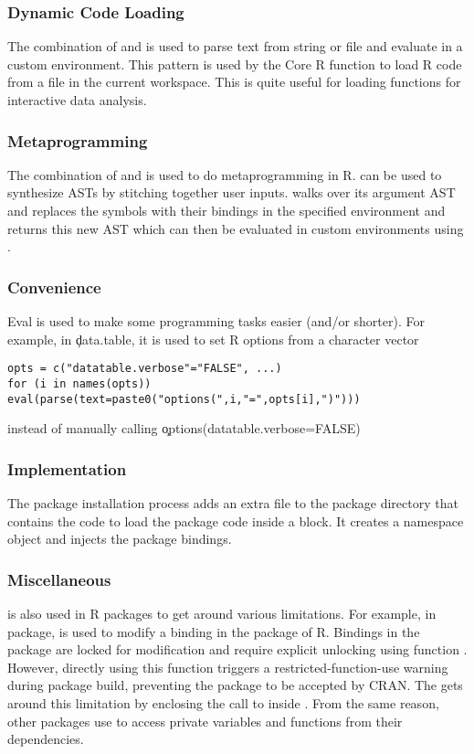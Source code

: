\documentclass[USenglish,cleveref, autoref, thm-restate]{lipics-v2019}
\begin{document}
\subsubsection{Dynamic Code Loading} The combination of \parse and \eval is
used to parse text from string or file and evaluate in a custom environment.
This pattern is used by the \source Core R function to load R code from a
file in the current workspace. This is quite useful for loading functions
for interactive data analysis.

\subsubsection{Metaprogramming} The combination of \eval and \substitute is
 used to do metaprogramming in R. \substitute can be used to synthesize ASTs
 by stitching together user inputs. \substitute walks over its argument AST
 and replaces the symbols with their bindings in the specified environment
 and returns this new AST which can then be evaluated in custom environments
 using \eval.

  \subsubsection{Convenience} Eval is used to make some programming tasks easier (and/or shorter). For example, in \c{data.table}, it is used to set R options from a character vector
  \begin{lstlisting}
opts = c("datatable.verbose"="FALSE", ...)
for (i in names(opts)) eval(parse(text=paste0("options(",i,"=",opts[i],")")))

  \end{lstlisting}
  instead of manually calling \c{options(datatable.verbose=FALSE)}

  \subsubsection{Implementation}
  The package installation process adds an extra file to the package directory
  that contains the code to load the package code inside a \local block. It
  creates a namespace object and injects the package bindings.

  \subsubsection{Miscellaneous} \eval is also used in R packages to get around
  various limitations. For example, in \datatable package, \eval is used to
  modify a binding in the \base package of R. Bindings in the \base package are
  locked for modification and require explicit unlocking using 
  function \unlockBinding. However, directly using this function triggers a
  restricted-function-use warning during package build, preventing the package
  to be accepted by CRAN. The \datatable gets around this limitation by
  enclosing the call to \unlockBinding inside \eval. From the same reason, other
  packages use \eval to access private variables and functions from their
  dependencies.
\end{document}
